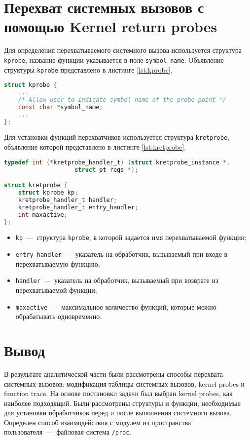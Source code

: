 \section{Перехват системных вызовов с помощью Kernel return probes}

Для определения перехватываемого системного вызова используется структура \texttt{kprobe}, название функции указывается в поле \texttt{symbol\_name}. Объявление структуры \texttt{kprobe} представлено в листинге \ref{lst:kprobe}.

\begin{lstlisting}[language=C, label=lst:kprobe, caption={Структура \texttt{kprobe}}]
struct kprobe {
	...
	/* Allow user to indicate symbol name of the probe point */
	const char *symbol_name;
	...
};
\end{lstlisting}

Для установки функций-перехватчиков используется структура \texttt{kretprobe}, объявление которой представлено в листинге \ref{lst:kretprobe}.

\begin{lstlisting}[language=C, label=lst:kretprobe, caption={Структура \texttt{kretprobe}}]
typedef int (*kretprobe_handler_t) (struct kretprobe_instance *,
				    struct pt_regs *);

struct kretprobe {
	struct kprobe kp;
	kretprobe_handler_t handler;
	kretprobe_handler_t entry_handler;
	int maxactive;
};
\end{lstlisting}

\begin{itemize}
	\item \texttt{kp}~---~структура \texttt{kprobe}, в которой задается имя перехватываемой функции;
	\item \texttt{entry\_handler}~---~указатель на обработчик, вызываемый при входе в перехватываемую функцию;
	\item \texttt{handler}~---~указатель на обработчик, вызываемый при возврате из перехватываемой функции;
	\item \texttt{maxactive}~---~максимальное количество функций, которые можно обрабатывать одновременно.
\end{itemize}

\section*{Вывод}

В результате аналитической части были рассмотрены способы перехвата системных вызовов: модификация таблицы системных вызовов, kernel probes и function trace. На основе постановки задачи был выбран kernel probes, как наиболее подходящий. Были рассмотрены структуры и функции, необходимые для установки обработчиков перед и после выполнения системного вызова. Определен способ взаимодействия с модулем из пространства пользователя~---~файловая система \texttt{/proc}.
